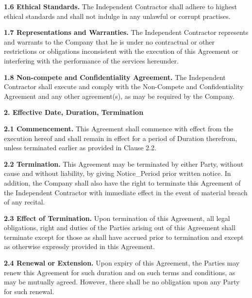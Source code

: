 \documentclass[12pt]{article}
\begin{document}
\vspace{0.5em}
\noindent
\textbf{1.6 Ethical Standards.} The Independent Contractor shall adhere to highest ethical standards and shall not indulge in any unlawful or corrupt practises.

\vspace{0.5em}
\noindent
\textbf{1.7 Representations and Warranties.} The Independent Contractor represents and warrants to the Company that he is under no contractual or other restrictions or obligations inconsistent with the execution of this Agreement or interfering with the performance of the services hereunder.

\vspace{0.5em}
\noindent
\textbf{1.8 Non-compete and Confidentiality Agreement.} The Independent Contractor shall execute and comply with the Non-Compete and Confidentiality Agreement and any other agreement(s), as may be required by the Company.

\vspace{1em}
\noindent
\textbf{2. Effective Date, Duration, Termination}

\vspace{0.5em}
\noindent
\textbf{2.1 Commencement.} This Agreement shall commence with effect from the execution hereof and shall remain in effect for a period of {{Duration}} therefrom, unless terminated earlier as provided in Clause 2.2.

\vspace{0.5em}
\noindent
\textbf{2.2 Termination.} This Agreement may be terminated by either Party, without cause and without liability, by giving {{Notice_Period}} prior written notice.
\newline
In addition, the Company shall also have the right to terminate this Agreement of the Independent Contractor with immediate effect in the event of material breach of any recital.

\vspace{0.5em}
\noindent
\textbf{2.3 Effect of Termination.} Upon termination of this Agreement, all legal obligations, right and duties of the Parties arising out of this Agreement shall terminate except for those as shall have accrued prior to termination and except as otherwise expressly provided in this Agreement.

\vspace{0.5em}
\noindent
\textbf{2.4 Renewal or Extension.} Upon expiry of this Agreement, the Parties may renew this Agreement for such duration and on such terms and conditions, as may be mutually agreed. However, there shall be no obligation upon any Party for such renewal.
\end{document}
